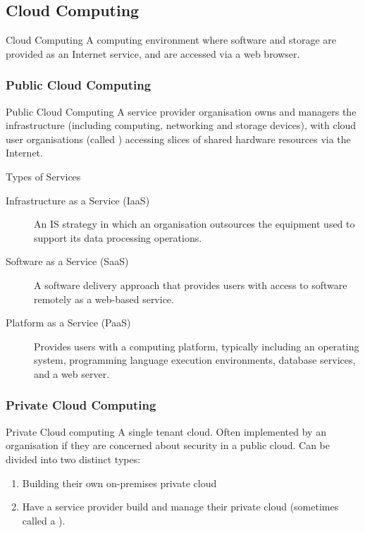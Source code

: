 \documentclass[\main/notes.tex]{subfiles}
\begin{document}
			\subsection{Cloud Computing}
				\begin{definition}{Cloud Computing}
					A computing environment where software and storage are provided as an Internet service, and are accessed via a web browser.
				\end{definition}
				\subsubsection{Public Cloud Computing}
					\begin{definition}{Public Cloud Computing}
						A service provider organisation owns and managers the infrastructure (including computing, networking and storage devices), with cloud user organisations (called ) accessing slices of shared hardware resources via the Internet.
					\end{definition}
					\begin{sidenote}{Types of Services}
						\begin{description}
							\item[Infrastructure as a Service (IaaS)] An IS strategy in which an organisation outsources the equipment used to support its data processing operations.
							\item[Software as a Service (SaaS)] A software delivery approach that provides users with access to software remotely as a web-based service.
							\item[Platform as a Service (PaaS)] Provides users with a computing platform, typically including an operating system, programming language execution environments, database services, and a web server.
						\end{description}
					\end{sidenote}
				\subsubsection{Private Cloud Computing}
					\begin{definition}{Private Cloud computing}
						A single tenant cloud. Often implemented by an organisation if they are concerned about security in a public cloud. Can be divided into two distinct types:
						\begin{enumerate}[nosep]
							\item Building their own on-premises private cloud
							\item Have a service provider build and manage their private cloud (sometimes called a ).
						\end{enumerate}
					\end{definition}
\end{document}
